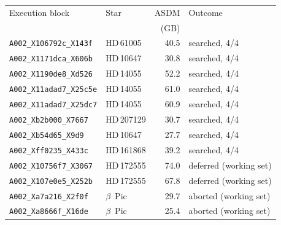 \begin{tabular}{@{}l@{~}l@{~}r@{~}l@{}}
\hline
Execution block & Star & ASDM & Outcome \\
 & & (GB) & \\
\hline
\texttt{A002\_X106792c\_X143f} & HD\,61005 & 40.5 & searched, 4/4 \\
\texttt{A002\_X1171dca\_X606b} & HD\,10647 & 30.8 & searched, 4/4 \\
\texttt{A002\_X1190de8\_Xd526} & HD\,14055 & 52.2 & searched, 4/4 \\
\texttt{A002\_X11adad7\_X25c5e} & HD\,14055 & 61.0 & searched, 4/4 \\
\texttt{A002\_X11adad7\_X25dc7} & HD\,14055 & 60.9 & searched, 4/4 \\
\texttt{A002\_Xb2b000\_X7667} & HD\,207129 & 30.7 & searched, 4/4 \\
\texttt{A002\_Xb54d65\_X9d9} & HD\,10647 & 27.7 & searched, 4/4 \\
\texttt{A002\_Xff0235\_X433c} & HD\,161868 & 39.2 & searched, 4/4 \\
\texttt{A002\_X10756f7\_X3067} & HD\,172555 & 74.0 & deferred (working set) \\
\texttt{A002\_X107e0e5\_X252b} & HD\,172555 & 67.8 & deferred (working set) \\
\texttt{A002\_Xa7a216\_X2f0f} & $\beta$~Pic & 29.7 & aborted (working set) \\
\texttt{A002\_Xa8666f\_X16de} & $\beta$~Pic & 25.4 & aborted (working set) \\
\hline
\end{tabular}
